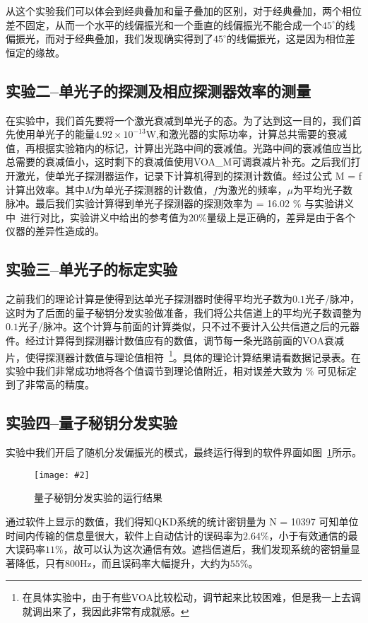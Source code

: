 \documentclass[11pt,a4paper]{ctexart}
\newcommand{\cpic}[2]{
\begin{center}
\texttt{[image: \#2]}
\end{center}
}
\newcommand{\cpicn}[3]
{
\begin{figure}[H]
\cpic{#1}{#2}
\caption{\color{red}#3\label{#2}}
\end{figure}
}
\begin{document}
从这个实验我们可以体会到经典叠加和量子叠加的区别，对于经典叠加，两个相位差不固定，从而一个水平的线偏振光和一个垂直的线偏振光不能合成一个$45^{\circ}$的线偏振光，而对于经典叠加，我们发现确实得到了$45^{\circ}$的线偏振光，这是因为相位差恒定的缘故。

\subsection{实验二--单光子的探测及相应探测器效率的测量}
在实验中，我们首先要将一个激光衰减到单光子的态。为了达到这一目的，我们首先使用单光子的能量$4.92\times 10^{-13}\mathrm{W}$,和激光器的实际功率，计算总共需要的衰减值，再根据实验箱内的标记，计算出光路中间的衰减值。光路中间的衰减值应当比总需要的衰减值小，这时剩下的衰减值使用VOA\_M可调衰减片补充。之后我们打开激光，使单光子探测器运作，记录下计算机得到的探测计数值。经过公式
\beq
M = f\mu \eta
\eeq
计算出效率。其中$M$为单光子探测器的计数值，$f$为激光的频率，$\mu$为平均光子数脉冲。最后我们实验计算得到单光子探测器的探测效率为
\beq
\eta = 16.02 \%
\eeq
与实验讲义中~\cite{lec}进行对比，实验讲义中给出的参考值为$20\%$量级上是正确的，差异是由于各个仪器的差异性造成的。
\subsection{实验三--单光子的标定实验}
之前我们的理论计算是使得到达单光子探测器时使得平均光子数为$0.1$光子/脉冲，这时为了后面的量子秘钥分发实验做准备，我们将公共信道上的平均光子数调整为$0.1$光子/脉冲。这个计算与前面的计算类似，只不过不要计入公共信道之后的元器件。经过计算得到探测器计数值应有的数值，调节每一条光路前面的VOA衰减片，使得探测器计数值与理论值相符~\footnote{在具体实验中，由于有些VOA比较松动，调节起来比较困难，但是我一上去调就调出来了，我因此非常有成就感。}。具体的理论计算结果请看数据记录表。在实验中我们非常成功地将各个值调节到理论值附近，相对误差大致为
\beq
{}\%
\eeq
可见标定到了非常高的精度。
\subsection{实验四--量子秘钥分发实验}
实验中我们开启了随机分发偏振光的模式，最终运行得到的软件界面如图~\ref{1}所示。
\cpicn{0.3}{1}{量子秘钥分发实验的运行结果}
通过软件上显示的数值，我们得知QKD系统的统计密钥量为
\beq
N = 10397 
\eeq
可知单位时间内传输的信息量很大，软件上自动估计的误码率为$2.64\%$，小于有效通信的最大误码率$11\%$，故可以认为这次通信有效。遮挡信道后，我们发现系统的密钥量显著降低，只有$800\mathrm{Hz}$，而且误码率大幅提升，大约为$55\%$。
\end{document}
